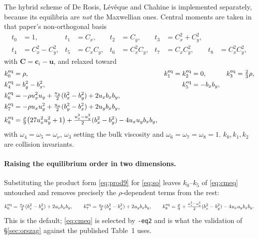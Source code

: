 \documentclass[11pt,a4paper]{article}
\newcommand{\code}[1]{\texttt{\small #1}}
\newcommand{\ci}{\bm{c}_i}
\newcommand{\uu}{\bm{u}}
\begin{document}
The hybrid scheme of De Rosis, L\'ev\^eque and Chahine \cite{derosis2018} is
implemented separately, because its equilibria are \emph{not} the Maxwellian ones.
Central moments are taken in that paper's non-orthogonal basis
\begin{equation}
\begin{aligned}
  t_0 &= 1, & t_1 &= C_x, & t_2 &= C_y, & t_3 &= C_x^2+C_y^2, \\
  t_4 &= C_x^2-C_y^2, & t_5 &= C_xC_y, & t_6 &= C_x^2C_y,
  & t_7 &= C_xC_y^2, & t_8 &= C_x^2C_y^2,
\end{aligned}
\end{equation}
with $\bm{C}=\ci-\uu$, and relaxed toward
\begin{equation}
\begin{aligned}
  k_0^{\rm eq} &= \rho, & k_1^{\rm eq} = k_2^{\rm eq} &= 0, &
  k_3^{\rm eq} &= \tfrac{2}{3}\rho, \\
  k_4^{\rm eq} &= b_y^2-b_x^2, & k_5^{\rm eq} &= -b_xb_y, \\
  k_6^{\rm eq} &= -\rho u_x^2u_y + \tfrac{u_y}{2}(b_x^2-b_y^2) + 2u_xb_xb_y, \\
  k_7^{\rm eq} &= -\rho u_xu_y^2 + \tfrac{u_x}{2}(b_y^2-b_x^2) + 2u_yb_xb_y, \\
  k_8^{\rm eq} &= \tfrac{\rho}{9}\big(27u_x^2u_y^2+1\big)
     + \tfrac{u_x^2-u_y^2}{2}(b_x^2-b_y^2) - 4u_xu_yb_xb_y,
\end{aligned}
\label{eq:cmeq}
\end{equation}
with $\omega_4=\omega_5=\omega_\nu$, $\omega_3$ setting the bulk viscosity and
$\omega_6=\omega_7=\omega_8=1$. $k_0,k_1,k_2$ are collision invariants.

\paragraph{Raising the equilibrium order in two dimensions.} Substituting the
product form \eqref{eq:prod9} for \eqref{eq:so} leaves $k_0$--$k_5$ of
\eqref{eq:cmeq} untouched and removes precisely the $\rho$-dependent terms from
the rest:
\begin{equation}
  k_6^{\rm eq} = \tfrac{u_y}{2}(b_x^2-b_y^2) + 2u_xb_xb_y,
  \qquad
  k_7^{\rm eq} = \tfrac{u_x}{2}(b_y^2-b_x^2) + 2u_yb_xb_y,
  \qquad
  k_8^{\rm eq} = \tfrac{\rho}{9}
    + \tfrac{u_x^2-u_y^2}{2}(b_x^2-b_y^2) - 4u_xu_yb_xb_y .
  \label{eq:cmeqho}
\end{equation}
This is the default; \eqref{eq:cmeq} is selected by \code{-eq2} and is what the
validation of \S\ref{sec:orszag} against the published Table~1 uses.
\end{document}
